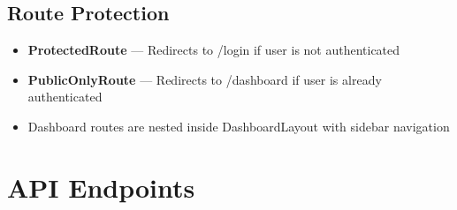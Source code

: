 \documentclass[12pt,a4paper]{article}
\begin{document}
\subsection{Route Protection}

\begin{itemize}[leftmargin=*]
    \item \textbf{ProtectedRoute} --- Redirects to /login if user is not authenticated
    \item \textbf{PublicOnlyRoute} --- Redirects to /dashboard if user is already authenticated
    \item Dashboard routes are nested inside DashboardLayout with sidebar navigation
\end{itemize}

\section{API Endpoints}
\end{document}
